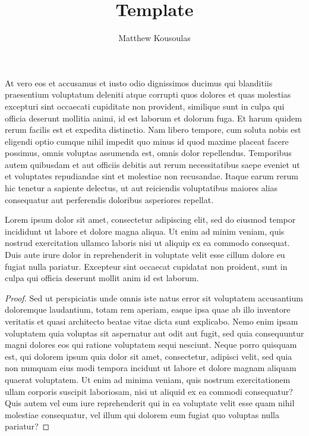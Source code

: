 \documentclass{article}
\title{Template}
\author{Matthew Kousoulas}
\begin{document}
\maketitle

\begin{lemma}
	At vero eos et accusamus et iusto odio dignissimos ducimus qui blanditiis
	praesentium voluptatum deleniti atque corrupti quos dolores et quas
	molestias excepturi sint occaecati cupiditate non provident, similique sunt
	in culpa qui officia deserunt mollitia animi, id est laborum et dolorum
	fuga. Et harum quidem rerum facilis est et expedita distinctio. Nam libero
	tempore, cum soluta nobis est eligendi optio cumque nihil impedit quo minus
	id quod maxime placeat facere possimus, omnis voluptas assumenda est, omnis
	dolor repellendus. Temporibus autem quibusdam et aut officiis debitis aut
	rerum necessitatibus saepe eveniet ut et voluptates repudiandae sint et
	molestiae non recusandae. Itaque earum rerum hic tenetur a sapiente
	delectus, ut aut reiciendis voluptatibus maiores alias consequatur aut
	perferendis doloribus asperiores repellat.
\end{lemma}
\popthm

\begin{exercise}
	Lorem ipsum dolor sit amet, consectetur adipiscing elit, sed do eiusmod
	tempor incididunt ut labore et dolore magna aliqua. Ut enim ad minim veniam,
	quis nostrud exercitation ullamco laboris nisi ut aliquip ex ea commodo
	consequat. Duis aute irure dolor in reprehenderit in voluptate velit esse
	cillum dolore eu fugiat nulla pariatur. Excepteur sint occaecat cupidatat
	non proident, sunt in culpa qui officia deserunt mollit anim id est laborum.
\end{exercise}

\begin{proof}
	Sed ut perspiciatis unde omnis iste natus error sit voluptatem accusantium
	doloremque laudantium, totam rem aperiam, eaque ipsa quae ab illo inventore
	veritatis et quasi architecto beatae vitae dicta sunt explicabo. Nemo enim
	ipsam voluptatem quia voluptas sit aspernatur aut odit aut fugit, sed quia
	consequuntur magni dolores eos qui ratione voluptatem sequi nesciunt. Neque
	porro quisquam est, qui dolorem ipsum quia dolor sit amet, consectetur,
	adipisci velit, sed quia non numquam eius modi tempora incidunt ut labore et
	dolore magnam aliquam quaerat voluptatem. Ut enim ad minima veniam, quis
	nostrum exercitationem ullam corporis suscipit laboriosam, nisi ut aliquid
	ex ea commodi consequatur? Quis autem vel eum iure reprehenderit qui in ea
	voluptate velit esse quam nihil molestiae consequatur, vel illum qui dolorem
	eum fugiat quo voluptas nulla pariatur?
\end{proof}
\end{document}
